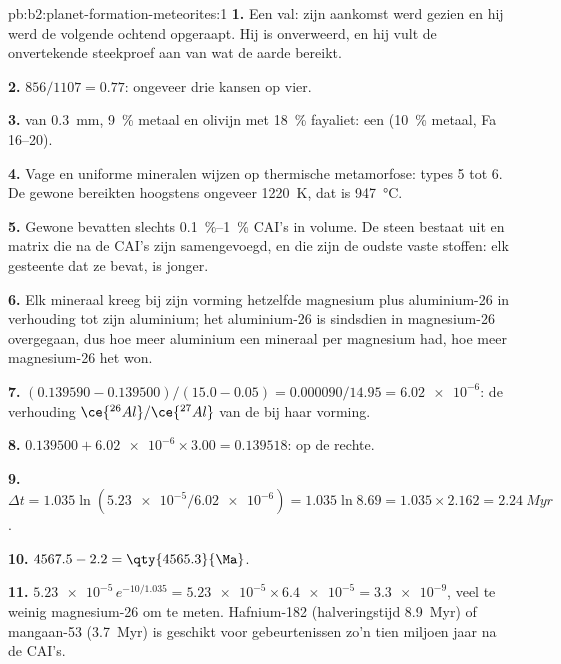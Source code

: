 \begin{solution}{pb:b2:planet-formation-meteorites:1}
\textbf{1.} Een val: zijn aankomst werd gezien en hij werd de volgende ochtend opgeraapt.
Hij is onverweerd, en hij vult de onvertekende steekproef aan van wat de aarde bereikt.

\textbf{2.} $856/1107 = 0.77$: ongeveer drie kansen op vier.

\textbf{3.}  van \qty{0.3}{mm}, \qty{9}{\percent} metaal en olivijn met
\qty{18}{\percent} fayaliet: een  (\qty{10}{\percent} metaal, Fa 16--20).

\textbf{4.} Vage  en uniforme mineralen wijzen op thermische metamorfose: types
5 tot 6. De gewone  bereikten hoogstens ongeveer \qty{1220}{K}, dat is
\qty{947}{\degreeCelsius}.

\textbf{5.} Gewone  bevatten slechts \qtyrange{0.1}{1}{\percent} CAI's in
volume. De steen bestaat uit  en matrix die na de CAI's zijn samengevoegd, en die
zijn de oudste vaste stoffen: elk gesteente dat ze bevat, is jonger.

\textbf{6.} Elk mineraal kreeg bij zijn vorming hetzelfde magnesium plus aluminium-26
in verhouding tot zijn aluminium; het aluminium-26 is sindsdien in
magnesium-26 overgegaan, dus hoe meer aluminium een mineraal per magnesium had, hoe meer
magnesium-26 het won.

\textbf{7.} $(0.139590 - 0.139500)/(15.0 - 0.05) = \num{0.000090}/14.95 =
\num{6.02e-6}$: de verhouding $\ce{^{26}Al}/\ce{^{27}Al}$ van de  bij haar
vorming.

\textbf{8.} $0.139500 + \num{6.02e-6}\times3.00 = 0.139518$: op de rechte.

\textbf{9.} $\Delta t = 1.035\ln(\num{5.23e-5}/\num{6.02e-6}) = 1.035\ln8.69 =
1.035\times2.162 = \qty{2.24}{Myr}$.

\textbf{10.} $4567.5 - 2.2 = \qty{4565.3}{\Ma}$.

\textbf{11.} $\num{5.23e-5}\,e^{-10/1.035} = \num{5.23e-5}\times\num{6.4e-5} =
\num{3.3e-9}$, veel te weinig magnesium-26 om te meten. Hafnium-182 (halveringstijd
\qty{8.9}{Myr}) of mangaan-53 (\qty{3.7}{Myr}) is geschikt voor gebeurtenissen zo'n tien miljoen jaar
na de CAI's.


\end{solution}
